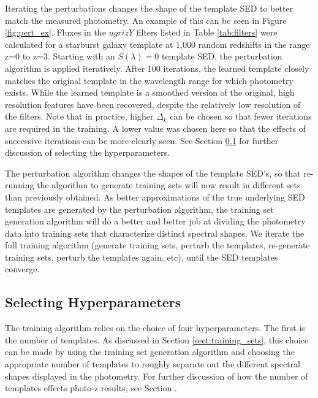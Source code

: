 Iterating the perturbations changes the shape of the template SED to better match the measured photometry. 
An example of this can be seen in Figure \ref{fig:pert_ex}. 
Fluxes in the $ugrizY$ filters listed in Table \ref{tab:filters} were calculated for a starburst galaxy template at 1,000 random redshifts in the range z=0 to z=3. 
Starting with an $S(\lambda) = 0$ template SED, the perturbation algorithm is applied iteratively. 
After 100 iterations, the learned template closely matches the original template in the wavelength range for which photometry exists. 
While the learned template is a smoothed version of the original, high resolution features have been recovered, despite the relatively low resolution of the filters. 
Note that in practice, higher $\Delta_k$ can be chosen so that fewer iterations are required in the training. 
A lower value was chosen here so that the effects of successive iterations can be more clearly seen.
See Section \ref{sect:hyperparameters} for further discussion of selecting the hyperparameters.

The perturbation algorithm changes the shapes of the template SED's, so that re-running the algorithm to generate training sets will now result in different sets than previously obtained. 
As better approximations of the true underlying SED templates are generated by the perturbation algorithm, the training set generation algorithm will do a better and better job at dividing the photometry data into training sets that characterize distinct spectral shapes. 
We iterate the full training algorithm (generate training sets, perturb the templates, re-generate training sets, perturb the templates again, etc), until the SED templates converge.




\subsection{Selecting Hyperparameters}
\label{sect:hyperparameters}

The training algorithm relies on the choice of four hyperparameters. 
The first is the number of templates. 
As discussed in Section \ref{sect:training_sets}, this choice can be made by using the training set generation algorithm and choosing the appropriate number of templates to roughly separate out the different spectral shapes displayed in the photometry.
For further discussion of how the number of templates effects photo-z results, see Section .


